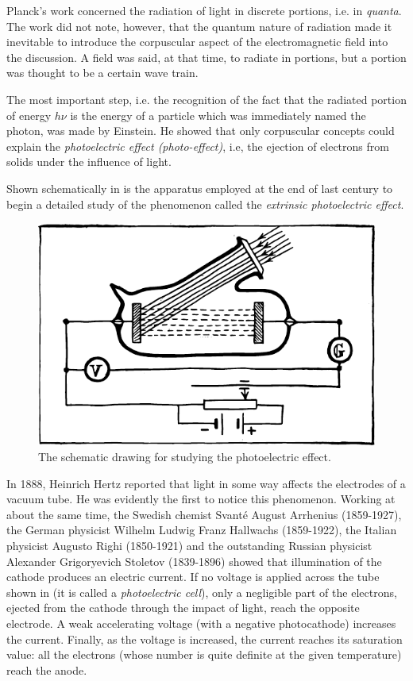 Planck's work concerned the radiation of light in discrete portions, i.e. in \emph{quanta}. The work did not note, however, that the quantum nature of radiation made it inevitable to introduce the corpuscular aspect of the electromagnetic field into the discussion. A field was said, at that time, to radiate in portions, but a portion was thought to be a certain wave train.

The most important step, i.e. the recognition of the fact that the radiated portion of energy $h\nu$ is the energy of a particle which was immediately named the photon, was made by Einstein. He showed that only corpuscular concepts could explain the \emph{photoelectric effect (photo-effect)}, i.e, the ejection of electrons from solids under the influence of light.

Shown schematically in  is the apparatus employed at the end of last century to begin a detailed study of the phenomenon called the \emph{extrinsic photoelectric effect}.

\begin{figure}[!ht]
\centering
\includegraphics[width=\textwidth]{figures/fig-05-04.pdf}
\caption{The schematic drawing for studying the photoelectric effect.}
\label{fig-5.4}
\end{figure}

In 1888, Heinrich Hertz reported that light in some way affects the electrodes of a vacuum tube. He was evidently the first to notice this phenomenon. Working at about the same time, the Swedish chemist Svant\'e August Arrhenius (1859-1927), the German physicist Wilhelm Ludwig Franz Hallwachs (1859-1922), the Italian physicist Augusto Righi (1850-1921) and the outstanding Russian physicist Alexander Grigoryevich Stoletov (1839-1896) showed that illumination of the cathode produces an electric current. If no voltage is applied across the tube shown in  (it is called a \emph{photoelectric cell}), only a negligible part of the electrons, ejected from the cathode through the impact of light, reach the opposite electrode. A weak accelerating voltage (with a negative photocathode) increases the current. Finally, as the voltage is increased, the current reaches its saturation value: all the electrons (whose number is quite definite at the given temperature) reach the anode.

